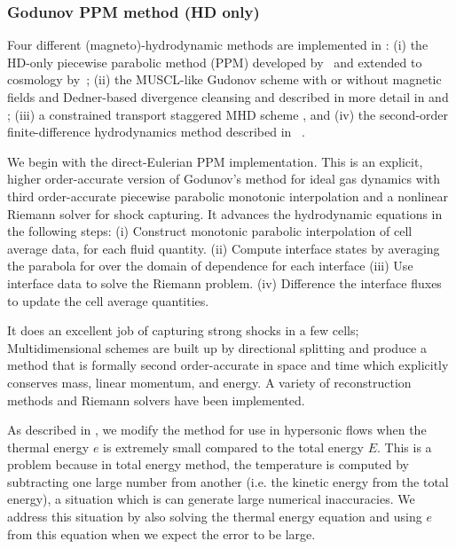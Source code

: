 \subsubsection{Godunov PPM method (HD only)}

Four different (magneto)-hydrodynamic methods are implemented in \enzo: (i) the
HD-only piecewise parabolic method (PPM) developed by~\citet{1984JCoPh..54..174C}
and extended to cosmology by~\citet{1995CoPhC..89..149B};
(ii) the MUSCL-like Gudonov scheme \citep{MUSCL} with or without magnetic fields
and Dedner-based divergence cleansing and described in more detail in 
\citet{WangAbelZhang08} and \citet{WangAbel09};
(iii) a constrained transport staggered MHD scheme \citet{Collins10}, and
(iv) the second-order finite-difference hydrodynamics method described 
in \zeus~\citep{Stone92a,Stone92b}. 

We begin with the direct-Eulerian PPM implementation.  
This is an explicit, higher order-accurate version of
Godunov's method for ideal gas dynamics with third order-accurate piecewise parabolic
monotonic interpolation and a nonlinear Riemann solver for shock
capturing.  It advances the hydrodynamic equations in the following
steps: 
 (i) Construct monotonic parabolic interpolation of cell average data, for each fluid quantity.
(ii) Compute interface states by averaging the parabola for over the domain of dependence for each interface
(iii) Use interface data to solve the Riemann problem.
 (iv) Difference the interface fluxes to update the cell average quantities.

It does an excellent job of capturing strong shocks in a few cells; Multidimensional schemes are built up by directional
splitting and produce a method that is formally second order-accurate
in space and time which explicitly conserves mass, linear momentum, and energy.  A variety of
reconstruction methods and Riemann solvers have been implemented.

As described in \citet{Bryan95}, we modify the method for use in hypersonic flows when the thermal energy $e$ is extremely small compared to the total energy $E$.  This is a problem because in total energy method, the temperature is computed by subtracting one large number from another (i.e. the kinetic energy from the total energy), a situation which is can generate large numerical inaccuracies.  We address this situation by also solving the thermal energy equation and using $e$ from this equation when we expect the error to be large.

